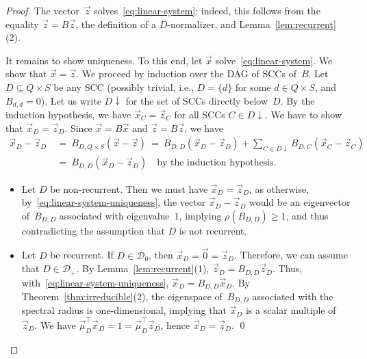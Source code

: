 \documentclass{elsarticle}
\def\cD{\mathcal{D}}
\begin{document}
\begin{proof}
  The vector~$\vec{z}$ solves~\eqref{eq:linear-system}: indeed, this
  follows from the equality $\vec{z} = B \vec{z}$, the definition of a
  $D$-normalizer, and Lemma~\ref{lem:recurrent}(2).

  It remains to show uniqueness.  To this end, let
  $\vec{x}$ solve~\eqref{eq:linear-system}.  We show that
  $\vec{x} = \vec{z}$.
We proceed by induction over the DAG of SCCs of~$B$.
Let $D \subseteq Q \times S$ be any SCC (possibly trivial, i.e., $D = \{d\}$ for some $d \in Q \times S$, and $B_{d,d} = 0$).
Let us write $D{\downarrow}$ for the set of SCCs directly below~$D$.
By the induction hypothesis, we have $\vec{x}_C = \vec{z}_C$ for all SCCs $C \in D{\downarrow}$.
We have to show that $\vec{x}_D = \vec{z}_D$.
Since $\vec{x} = B \vec{x}$ and $\vec{z} = B \vec{z}$, we have
\begin{equation} \label{eq:linear-system-uniqueness}
\begin{aligned}
\vec{x}_D - \vec{z}_D \ &= \ B_{D, Q \times S} (\vec{x} - \vec{z}) \ = \ B_{D,D} (\vec{x}_D - \vec{z}_D) + \sum_{C \in D{\downarrow}} B_{D,C} (\vec{x}_C - \vec{z}_C) \\
                        &= \ B_{D,D} (\vec{x}_D - \vec{z}_D) \quad \text{by the induction hypothesis.}
\end{aligned}
\end{equation}

\begin{itemize}
\item
Let $D$ be non-recurrent.
Then we must have $\vec{x}_D = \vec{z}_D$, as otherwise, by~\eqref{eq:linear-system-uniqueness}, the vector $\vec{x}_D - \vec{z}_D$ would be an eigenvector of~$B_{D,D}$ associated with eigenvalue~$1$, implying $\rho(B_{D,D}) \ge 1$, and thus contradicting the assumption that $D$ is not recurrent.
\item
Let $D$ be recurrent. If $D \in \cD_0$, then $\vec{x}_D = \vec{0} = \vec{z}_D$.
Therefore, we can assume that $D \in \cD_+$.
By Lemma~\ref{lem:recurrent}(1), $\vec{z}_D = B_{D,D} \vec{z}_D$.
Thus, with~\eqref{eq:linear-system-uniqueness}, $\vec{x}_D = B_{D,D} \vec{x}_D$.
By Theorem~\ref{thm:irreducible}(2), the eigenspace of~$B_{D,D}$ associated with the spectral radius is one-dimensional, implying that $\vec{x}_D$ is a scalar multiple of~$\vec{z}_D$.
We have $\vec{\mu}_D^\top \vec{x}_D = 1 = \vec{\mu}_D^\top \vec{z}_D$, hence $\vec{x}_D = \vec{z}_D$.
\qed
\end{itemize}
\end{proof}
\end{document}

